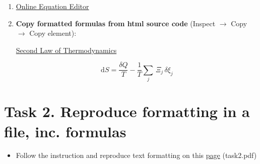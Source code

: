 \documentclass[a4paper,11pt,leqno]{article}
\begin{document}
\begin{enumerate}
	\item \href{https://latexeditor.lagrida.com/}{Online Equation Editor} 
	\item \textbf{{\color{red}Copy formatted formulas from html source code}} (Inspect $\rightarrow$ Copy $\rightarrow$ Copy element):
	
	\href{https://en.wikipedia.org/wiki/Second_law_of_thermodynamics}{Second Law of Thermodynamics}
	
	\[\mathrm {d} S={\frac {\delta Q}{T}}-{\frac {1}{T}}\sum _{j}\,\Xi _{j}\,\delta \xi _{j}\]
\end{enumerate}

\section*{Task 2. Reproduce formatting in a file, inc. formulas}
\label{task}

\begin{tcolorbox}[width=\textwidth, colback={yellow!40!white}, title={}, colbacktitle=yellow!60!white, coltitle=black]
	\begin{itemize}
		\item Follow the instruction and reproduce text formatting on this \href{https://github.com/kunilovskaya/dskills_workshop/blob/main/w1_latex_basics/task2.pdf}{page} (task2.pdf)
	\end{itemize}
	
\end{tcolorbox}%
\end{document}
